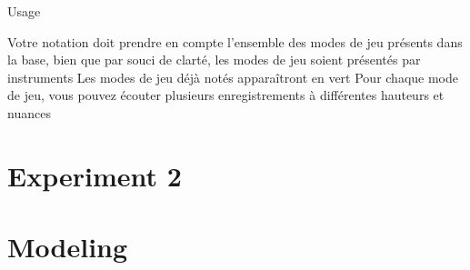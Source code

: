 \documentclass{article}
\begin{document}
Usage

Votre notation doit prendre en compte l'ensemble des modes de jeu présents dans la base, bien que par souci de clarté, les modes de jeu soient présentés par instruments
Les modes de jeu déjà notés apparaîtront en vert
Pour chaque mode de jeu, vous pouvez écouter plusieurs enregistrements à différentes hauteurs et nuances



\section{Experiment 2}\label{sec:}

\section{Modeling}\label{sec:}




%
%
%
%
\end{document}
